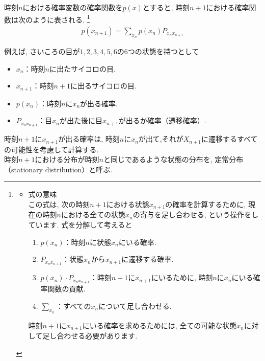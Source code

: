 \documentclass[a4j]{jsarticle}
\begin{document}
時刻$n$における確率変数の確率関数を$p(x)$とすると, 時刻$n+1$における確率関数は次のように表される.
\footnote{
	\begin{itemize}
		\item 式の意味\\
		      この式は, 次の時刻$n+1$における状態$x_{n+1}$の確率を計算するために, 現在の時刻$n$における全ての状態$x_n$の寄与を足し合わせる, という操作をしています. 式を分解して考えると
		      \begin{enumerate}
			      \item $p(x_n)$：時刻$n$に状態$x_n$にいる確率.
			      \item $P_{x_nx_{n+1}}$：状態$x_n$から$x_{n+1}$に遷移する確率.
			      \item $p(x_n) \cdot P_{x_nx_{n+1}}$：時刻$n+1$に$x_{n+1}$にいるために, 時刻$n$に$x_n$にいる確率関数の貢献.
			      \item $\sum_{x_n}$：すべての$x_n$について足し合わせる.
		      \end{enumerate}
		      時刻$n+1$に$x_{n+1}$にいる確率を求めるためには, 全ての可能な状態$x_n$に対して足し合わせる必要があります.
	\end{itemize}
}
\begin{align}
	p(x_{n+1}) = \sum_{x_n} p(x_n)P_{x_nx_{n+1}}
\end{align}

 例えば, さいころの目が$1, 2, 3, 4, 5, 6$の6つの状態を持つとして
\begin{itemize}
	\item $x_n$：時刻$n$に出たサイコロの目.
	\item $x_{n+1}$：時刻$n+1$に出るサイコロの目.
	\item $p(x_n)$：時刻$n$に$x_n$が出る確率.
	\item $P_{x_nx_{n+1}}$：目$x_n$が出た後に目$x_{n+1}$が出るか確率（遷移確率）.
\end{itemize}
時刻$n+1$に$x_{n+1}$が出る確率は, 時刻$n$に$x_n$が出て,それが$X_{n+1}$に遷移するすべての可能性を考慮して計算する.\\

 時刻$n+1$における分布が時刻$n$と同じであるような状態の分布を, 定常分布（stationary distribution）と呼ぶ.\\
\end{document}
